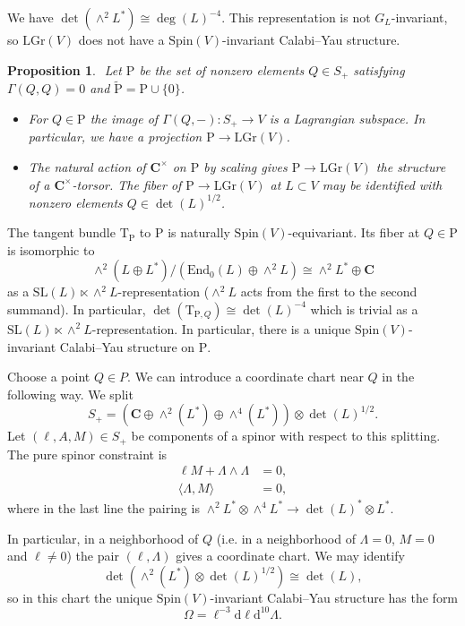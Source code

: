 \documentclass[12pt]{amsart}
\newcommand{\C}{\mathbf{C}}
\renewcommand{\d}{\mathrm{d}}
\renewcommand{\P}{\mathrm{P}}
\newcommand{\T}{\mathrm{T}}
\newcommand{\End}{\mathrm{End}}
\newcommand{\LGr}{\mathrm{LGr}}
\newcommand{\SL}{\mathrm{SL}}
\newcommand{\Spin}{\mathrm{Spin}}
\newtheorem{prop}[thm]{Proposition}
\theoremstyle{definition}
\theoremstyle{remark}
\begin{document}
We have $\det(\wedge^2 L^*) \cong \deg(L)^{-4}$. This representation is not $G_L$-invariant, so $\LGr(V)$ does not have a $\Spin(V)$-invariant Calabi--Yau structure.

\begin{prop}$ $
Let $\P$ be the set of nonzero elements $Q\in S_+$ satisfying $\Gamma(Q, Q) = 0$ and $\tilde{\P} = \P\cup \{0\}$.
\begin{itemize}
\item For $Q\in \P$ the image of $\Gamma(Q, -)\colon S_+\rightarrow V$ is a Lagrangian subspace. In particular, we have a projection $\P\rightarrow \LGr(V)$.

\item The natural action of $\C^\times$ on $\P$ by scaling gives $\P\rightarrow \LGr(V)$ the structure of a $\C^\times$-torsor. The fiber of $\P\rightarrow \LGr(V)$ at $L\subset V$ may be identified with nonzero elements $Q\in\det(L)^{1/2}$.
\end{itemize}
\end{prop}

The tangent bundle $\T_\P$ to $\P$ is naturally $\Spin(V)$-equivariant. Its fiber at $Q\in \P$ is isomorphic to
\[\wedge^2(L\oplus L^*) / (\End_0(L)\oplus \wedge^2 L)\cong \wedge^2 L^* \oplus \C\]
as a $\SL(L)\ltimes \wedge^2 L$-representation ($\wedge^2 L$ acts from the first to the second summand). In particular, $\det(\T_{\P, Q})\cong \det(L)^{-4}$ which is trivial as a $\SL(L)\ltimes \wedge^2 L$-representation. In particular, there is a unique $\Spin(V)$-invariant Calabi--Yau structure on $\P$.

Choose a point $Q\in P$. We can introduce a coordinate chart near $Q$ in the following way. We split
\[S_+ = (\C\oplus \wedge^2(L^*)\oplus \wedge^4(L^*))\otimes \det(L)^{1/2}.\]
Let $(\ell, A, M)\in S_+$ be components of a spinor with respect to this splitting. The pure spinor constraint is
\begin{align*}
\ell M + \Lambda\wedge \Lambda &= 0,\\
\langle \Lambda, M\rangle &= 0,
\end{align*}
where in the last line the pairing is $\wedge^2 L^*\otimes \wedge^4 L^*\rightarrow \det(L)^*\otimes L^*$.

In particular, in a neighborhood of $Q$ (i.e. in a neighborhood of $\Lambda=0$, $M=0$ and $\ell\neq 0$) the pair $(\ell, \Lambda)$ gives a coordinate chart. We may identify
\[\det(\wedge^2(L^*)\otimes \det(L)^{1/2})\cong \det(L),\]
so in this chart the unique $\Spin(V)$-invariant Calabi--Yau structure has the form
\[\Omega = \ell^{-3} \d \ell \d^{10} \Lambda.\]
\end{document}
